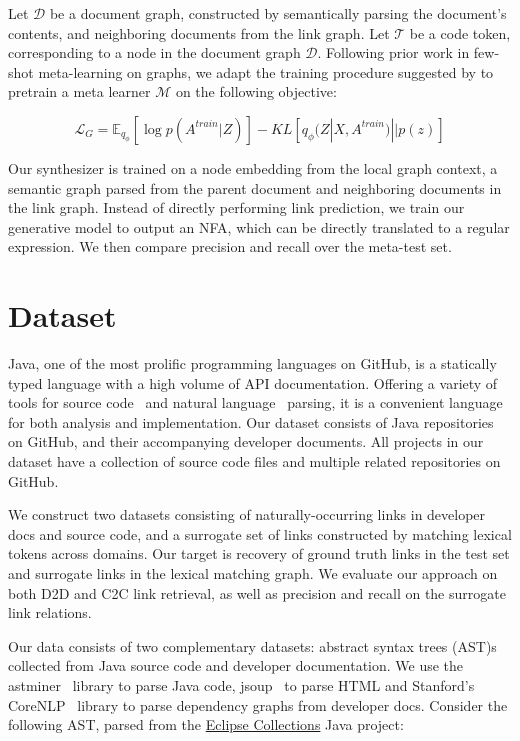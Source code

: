 \documentclass{article}
\begin{document}
Let $\mathcal D$ be a document graph, constructed by semantically parsing the document's contents, and neighboring documents from the link graph. Let $\mathcal T$ be a code token, corresponding to a node in the document graph $\mathcal D$. Following prior work in few-shot meta-learning on graphs, we adapt the training procedure suggested by \citet{bose2019meta} to pretrain a meta learner $\mathcal M$ on the following objective:

\begin{equation}
    \mathcal L_{G} = \mathbb E_{q_\phi}[\log p(A^{train}|Z)] - KL[q_\phi(Z|X, A^{train}) || p(z)]
\end{equation}

Our synthesizer is trained on a node embedding from the local graph context, a semantic graph parsed from the parent document and neighboring documents in the link graph. Instead of directly performing link prediction, we train our generative model to output an NFA, which can be directly translated to a regular expression. We then compare precision and recall over the meta-test set.

\section{Dataset}

Java, one of the most prolific programming languages on GitHub, is a statically typed language with a high volume of API documentation. Offering a variety of tools for source code~\citep{parr2013definitive, hosseini2013javaparser, kovalenko2019pathminer} and natural language~\citep{manning2014stanford, grella2018non} parsing, it is a convenient language for both analysis and implementation. Our dataset consists of Java repositories on GitHub, and their accompanying developer documents. All projects in our dataset have a collection of source code files and multiple related repositories on GitHub.

We construct two datasets consisting of naturally-occurring links in developer docs and source code, and a surrogate set of links constructed by matching lexical tokens across domains. Our target is recovery of ground truth links in the test set and surrogate links in the lexical matching graph. We evaluate our approach on both D2D and C2C link retrieval, as well as precision and recall on the surrogate link relations.

Our data consists of two complementary datasets: abstract syntax trees (AST)s collected from Java source code and developer documentation. We use the astminer~\citep{kovalenko2019pathminer} library to parse Java code, jsoup~\citep{hedley2009jsoup} to parse HTML and Stanford's CoreNLP~\citep{manning2014stanford} library to parse dependency graphs from developer docs. Consider the following AST, parsed from the \href{https://www.eclipse.org/collections/}{Eclipse Collections} Java project:
\end{document}
